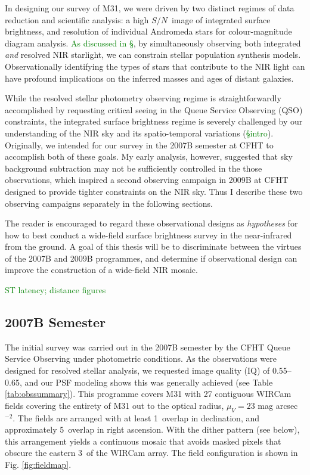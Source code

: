 \documentclass[iop]{emulateapj}
\newcommand{\sn}{\ensuremath{S/N}} %
\newcommand{\todo}[1]{\textcolor{green}{#1}}
\begin{document}
In designing our survey of M31, we were driven by two distinct regimes of data reduction and scientific analysis: a high \sn\ image of integrated surface brightness, and resolution of individual Andromeda stars for colour-magnitude diagram analysis. \todo{As discussed in \S}, by simultaneously observing both integrated \emph{and} resolved NIR starlight, we can constrain stellar population synthesis models. Observationally identifying the types of stars that contribute to the NIR light can have profound implications on the inferred masses and ages of distant galaxies.

While the resolved stellar photometry observing regime is straightforwardly accomplished by requesting critical seeing in the Queue Service Observing (QSO) constraints, the integrated surface brightness regime is severely challenged by our understanding of the NIR sky and its spatio-temporal variations (\todo{\S intro}). Originally, we intended for our survey in the 2007B semester at CFHT to accomplish both of these goals. My early analysis, however, suggested that sky background subtraction may not be sufficiently controlled in the those observations, which inspired a second observing campaign in 2009B at CFHT designed to provide tighter constraints on the NIR sky. Thus I describe these two observing campaigns separately in the following sections.

The reader is encouraged to regard these observational designs as \emph{hypotheses} for how to best conduct a wide-field surface brightness survey in the near-infrared from the ground. A goal of this thesis will be to discriminate between the virtues of the 2007B and 2009B programmes, and determine if observational design can improve the construction of a wide-field NIR mosaic.

\todo{ST latency; distance figures}

\subsection{2007B Semester} %
\label{sec:obs7}

The initial survey was carried out in the 2007B semester by the CFHT Queue Service Observing under photometric conditions. As the observations were designed for resolved stellar analysis, we requested image quality (IQ) of 0.55\arcsec--0.65\arcsec, and our PSF modeling shows this was generally achieved (see Table \ref{tab:obssummary}). This programme covers M31 with 27 contiguous WIRCam fields covering the entirety of M31 out to the optical radius, $\mu_V=23$ mag arcsec$^{-2}$. The fields are arranged with at least 1\arcmin\ overlap in declination, and approximately 5\arcmin\ overlap in right ascension.
With the dither pattern (see below), this arrangement yields a continuous mosaic that avoids masked pixels that obscure the eastern 3\arcmin\ of the WIRCam array. The field configuration is shown in Fig. \ref{fig:fieldmap}.
\end{document}
